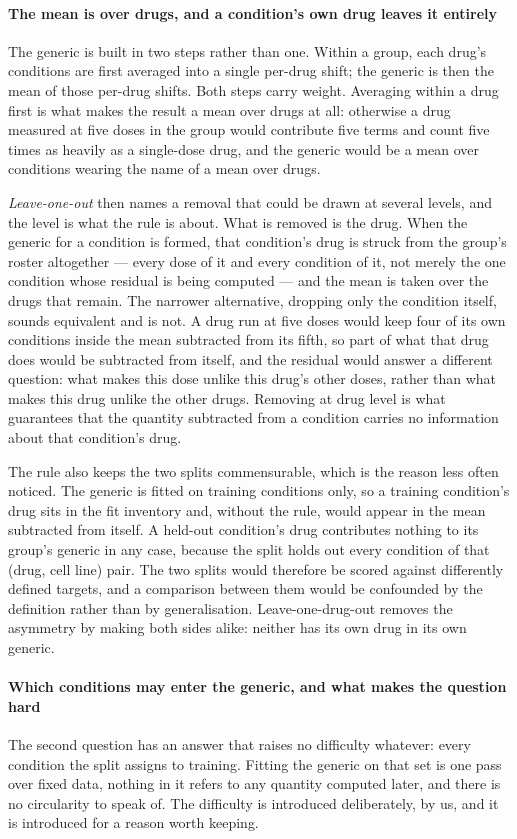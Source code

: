 \paragraph{The mean is over drugs, and a condition's own drug leaves it entirely}
The generic is built in two steps rather than one. Within a group, each drug's
conditions are first averaged into a single per-drug shift; the generic is then the
mean of those per-drug shifts. Both steps carry weight. Averaging within a drug
first is what makes the result a mean over drugs at all: otherwise a drug measured
at five doses in the group would contribute five terms and count five times as
heavily as a single-dose drug, and the generic would be a mean over conditions
wearing the name of a mean over drugs.

\emph{Leave-one-out} then names a removal that could be drawn at several levels,
and the level is what the rule is about. What is removed is the drug. When the
generic for a condition is formed, that condition's drug is struck from the group's
roster altogether --- every dose of it and every condition of it, not merely the one
condition whose residual is being computed --- and the mean is taken over the drugs
that remain. The narrower alternative, dropping only the condition itself, sounds
equivalent and is not. A drug run at five doses would keep four of its own
conditions inside the mean subtracted from its fifth, so part of what that drug does
would be subtracted from itself, and the residual would answer a different question:
what makes this dose unlike this drug's other doses, rather than what makes this
drug unlike the other drugs. Removing at drug level is what guarantees that the
quantity subtracted from a condition carries no information about that condition's
drug.

The rule also keeps the two splits commensurable, which is the reason less often
noticed. The generic is fitted on training conditions only, so a training
condition's drug sits in the fit inventory and, without the rule, would appear in
the mean subtracted from itself. A held-out condition's drug contributes nothing to
its group's generic in any case, because the split holds out every condition of that
(drug, cell line) pair. The two splits would therefore be scored against
differently defined targets, and a comparison between them would be confounded by
the definition rather than by generalisation. Leave-one-drug-out removes the
asymmetry by making both sides alike: neither has its own drug in its own generic.

\paragraph{Which conditions may enter the generic, and what makes the question
hard} The second question has an answer that raises no difficulty whatever: every
condition the split assigns to training. Fitting the generic on that set is one
pass over fixed data, nothing in it refers to any quantity computed later, and
there is no circularity to speak of. The difficulty is introduced deliberately,
by us, and it is introduced for a reason worth keeping.

